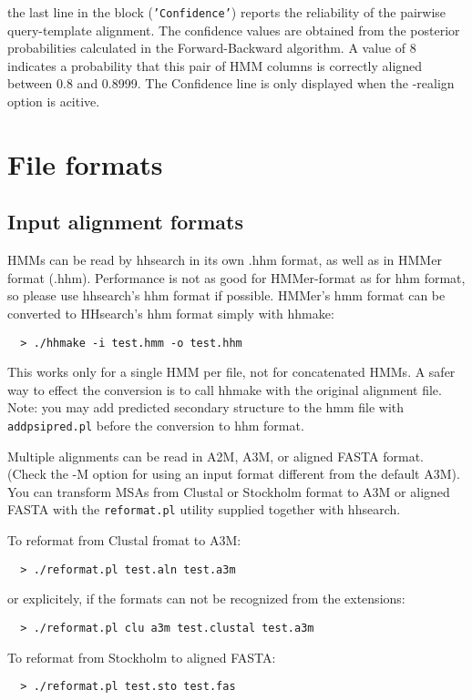 \documentclass[11pt,a4paper]{article}
\begin{document}
the last line in the block ({\tt 'Confidence'}) reports the reliability of the pairwise 
query-template alignment. The confidence values are obtained from the posterior 
probabilities calculated in the Forward-Backward algorithm. A value of 8 indicates
a probability that this pair of HMM columns is correctly aligned between 0.8 and 0.8999. 
The Confidence line is only displayed when the -realign option is acitive.






\section{File formats}

\subsection{Input alignment formats}

HMMs can be read by hhsearch in its own .hhm format, as well as in HMMer format (.hhm).
Performance is not as good for HMMer-format as for hhm format, so please use 
hhsearch's hhm format if possible. HMMer's hmm format can be converted to HHsearch's 
hhm format simply with hhmake:
\begin{verbatim}
  > ./hhmake -i test.hmm -o test.hhm
\end{verbatim}

This works only for a single HMM per file, not for concatenated HMMs. A safer way to 
effect the conversion is to call hhmake with the original alignment file. Note: you 
may add predicted secondary structure to the hmm file with \verb`addpsipred.pl` before the 
conversion to hhm format.


Multiple alignments can be read in A2M, A3M, or aligned FASTA format. (Check the -M option for 
using an input format different from the default A3M). You can transform MSAs 
from Clustal or Stockholm format to A3M or aligned FASTA with the \verb`reformat.pl` utility 
supplied together with hhsearch. 

To reformat from Clustal fromat to A3M:
\begin{verbatim}
  > ./reformat.pl test.aln test.a3m
\end{verbatim}
or explicitely, if the formats can not be recognized from the extensions:
\begin{verbatim}
  > ./reformat.pl clu a3m test.clustal test.a3m
\end{verbatim}
To reformat from Stockholm to aligned FASTA:
\begin{verbatim}
  > ./reformat.pl test.sto test.fas
\end{verbatim}
\end{document}

